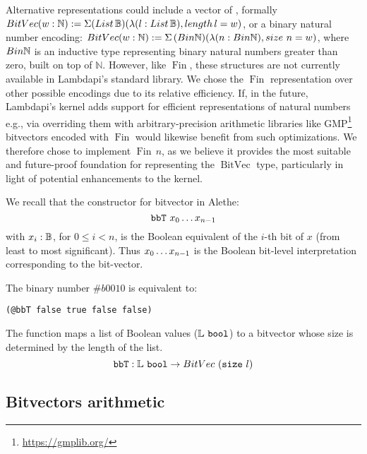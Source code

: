 Alternative representations could include a vector of \B{},
formally $\mathop{BitVec}(w: \mathbb{N}) := \Sigma(\mathop{List\,\mathbb{B}})(\lambda(l: \mathop{List\,\mathbb{B}}),\mathop{length}l = w)$,
or a binary natural number encoding: $\mathop{BitVec}(w: \mathbb{N}) := \Sigma\,(\mathop{Bin\mathbb{N}})(\lambda (n:\mathop{Bin\mathbb{N}}), \mathop{size}\,n = w)$, where $\mathop{Bin\mathbb{N}}$
is an inductive type representing binary natural numbers greater than zero, built on top of $\mathbb{N}$.
However, like $\mathop{Fin}$, these structures are not currently available in Lambdapi's standard library.
We chose the $\mathop{Fin}$ representation over other possible encodings due to its relative efficiency.
If, in the future, Lambdapi's kernel adds support for efficient representations of natural numbers e.g.,
via overriding them with arbitrary-precision arithmetic libraries like GMP\footnote{\url{https://gmplib.org/}} bitvectors encoded with $\mathop{Fin}$ would likewise benefit from such optimizations.
We therefore chose to implement $\mathop{Fin}\,n$, as we believe it provides the most suitable and future-proof foundation for representing the $\mathop{BitVec}$ type,
particularly in light of potential enhancements to the kernel.


We recall that the constructor for bitvector in Alethe: $$\mathtt{bbT}\ \enum[n-1]{x}[][0]$$ with $x_i: \mathbb{B}$, for $0\leq i< n$,
is the Boolean equivalent of the $i$-th bit of $x$ (from least to most significant). Thus $\enum[n-1]{x}[][0]$ is the Boolean bit-level interpretation corresponding to the bit-vector.

\begin{example}
The binary number $\#b0010$ is equivalent to:

\begin{lstlisting}[language=SMT]
(@bbT false true false false)
\end{lstlisting}
\end{example}

\begin{definition}
The function  maps a list of Boolean values ($\mathbb{L}~\texttt{\upshape{bool}}$) to a bitvector whose size is determined by the length of the list.
\begin{equation*}
\texttt{\upshape{bbT}} : \mathbb{L}~\texttt{\upshape{bool}} \rightarrow BitVec~(\texttt{\upshape{size}}~l)
\end{equation*}
\end{definition}

\subsection{Bitvectors arithmetic}

